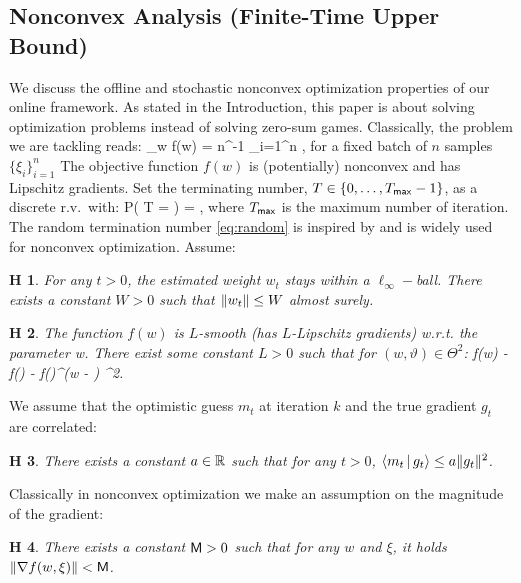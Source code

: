 \documentclass[11pt]{article}
\newtheorem{assumption}{H\!\!}
\theoremstyle{k}
\begin{document}
\subsection{Nonconvex Analysis (Finite-Time Upper Bound)}
We discuss the offline and stochastic nonconvex optimization properties of our online framework.
As stated in the Introduction, this paper is about solving optimization problems instead of solving zero-sum games.  
Classically, the problem we are tackling reads:
\beq\label{eq:minproblem}
\min \limits_{w \in \Theta} f(w) \eqdef  \EE[ f(w, \xi)] = n^{-1} \sum_{i=1}^n  \EE[f(w, \xi_i)] \eqsp,
\eeq
for a fixed batch of $n$ samples $\{ \xi_i \}_{i=1}^n$
The objective function $f(w)$ is (potentially) nonconvex and has Lipschitz gradients.
Set the terminating number, $T \in \{0,\dots,T_{\sf max}-1\}$, as a discrete r.v.~with:
\beq \label{eq:random}
   P( T = \ell ) =  \eqsp,
\eeq
where $T_{\sf max}$ is the maximum number of iteration.
The random termination number \eqref{eq:random} is inspired by \citep{ghadimi2013stochastic} and is widely used for nonconvex optimization. 
Assume:
\begin{assumption}\label{ass:boundedparam}
For any $t >0$, the estimated weight $w_t$ stays within a $\ell_{\infty}-$ball. There exists a constant $W >0$ such that $\left\Vert w_t \right\Vert \leq W$ almost surely.
\end{assumption}
\begin{assumption}\label{ass:smooth}
The function $f(w)$ is $L$-smooth (has $L$-Lipschitz gradients) w.r.t. the parameter w.
There exist some constant $L > 0$ such that for $(w, \vartheta) \in \Theta^2$:
\beq\notag
f(w) - f(\vartheta) - \nabla f(\vartheta)^\top(w - \vartheta) \leq {} ^2\eqsp.
\eeq
\end{assumption}
We assume that the optimistic guess $m_t$ at iteration $k$ and the true gradient $g_t$ are correlated:
\begin{assumption}\label{ass:guessbound}
There exists a constant $a \in \mathbb{R} $ such that for any $t >0$, $ \left\langle m_t\,|\, g_t \right\rangle  \leq a \|g_t\|^2$.
\end{assumption}
Classically in nonconvex optimization \citep{ghadimi2013stochastic} we make an assumption on the magnitude of the gradient:
\begin{assumption}\label{ass:bounded}
There exists a constant $\mathsf{M} >0$ such that for any $w$ and $\xi$, it holds $\left\Vert \nabla f(w, \xi) \right\Vert < \mathsf{M}$.
\end{assumption}
\end{document}
